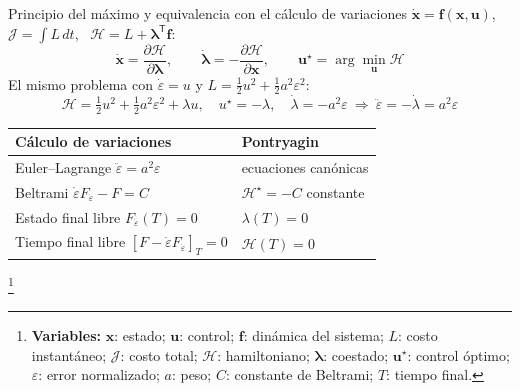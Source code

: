 \documentclass[aspectratio=169,10pt]{beamer}
\newcommand{\vect}[1]{\bm{#1}}
\newcommand{\T}{^{\mathsf{T}}}
\newcommand{\variables}[1]{\begingroup\renewcommand{\thefootnote}{}\footnote[frame]{\textbf{Variables:} #1}\addtocounter{footnote}{-1}\endgroup}
\begin{document}
\begin{frame}{Principio del máximo y equivalencia con el cálculo de variaciones}
\small
$\dot{\vect x} = \vect f(\vect x, \vect u)$, $\mathcal J = \int L\,dt$, \ $\mathcal H = L + \vect\lambda\T\vect f$:
\[
\dot{\vect x} = \frac{\partial\mathcal H}{\partial\vect\lambda},\qquad \dot{\vect\lambda} = -\frac{\partial\mathcal H}{\partial\vect x},\qquad \vect u^\star = \arg\min_{\vect u}\mathcal H
\]
El mismo problema con $\dot\varepsilon = u$ y $L = \tfrac12u^2 + \tfrac12a^2\varepsilon^2$:
\[
\mathcal H = \tfrac12u^2 + \tfrac12a^2\varepsilon^2 + \lambda u,\quad u^\star = -\lambda,\quad \dot\lambda = -a^2\varepsilon\ \Rightarrow\ \ddot\varepsilon = -\dot\lambda = a^2\varepsilon
\]
\begin{center}
\footnotesize
\begin{tabular}{@{}ll@{}}
\toprule
Cálculo de variaciones & Pontryagin \\
\midrule
Euler--Lagrange $\ddot\varepsilon = a^2\varepsilon$ & ecuaciones canónicas \\
Beltrami $\dot\varepsilon F_{\dot\varepsilon} - F = C$ & $\mathcal H^\star = -C$ constante \\
Estado final libre $F_{\dot\varepsilon}(T) = 0$ & $\lambda(T) = 0$ \\
Tiempo final libre $[F - \dot\varepsilon F_{\dot\varepsilon}]_T = 0$ & $\mathcal H(T) = 0$ \\
\bottomrule
\end{tabular}
\end{center}
\variables{$\vect x$: estado; $\vect u$: control; $\vect f$: dinámica del sistema; $L$: costo instantáneo; $\mathcal J$: costo total; $\mathcal H$: hamiltoniano; $\vect\lambda$: coestado; $\vect u^\star$: control óptimo; $\varepsilon$: error normalizado; $a$: peso; $C$: constante de Beltrami; $T$: tiempo final.}
\end{frame}
\end{document}
